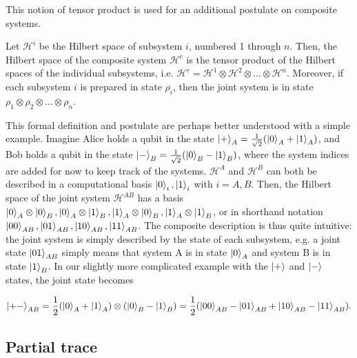 \noindent This notion of tensor product is used for an additional postulate on composite systems.

\begin{postulate} \label{pos:composite}
    Let $\mathcal{H}^i$ be the Hilbert space of subsystem $i$, numbered 1 through $n$. Then, the Hilbert space of the composite system $\mathcal{H}^c$ is the tensor product of the Hilbert spaces of the individual subsystems, i.e. $\mathcal{H}^c = \mathcal{H}^1 \otimes \mathcal{H}^2 \otimes \dots \otimes \mathcal{H}^n$. Moreover, if each subsystem $i$ is prepared in state $\rho_i$, then the joint system is in state $\rho_1 \otimes \rho_2 \otimes \dots \otimes \rho_n$.
\end{postulate}

This formal definition and postulate are perhaps better understood with a simple example. Imagine Alice holds a qubit in the state $\ket{+}_A = \frac{1}{\sqrt{2}}(\ket{0}_A + \ket{1}_A)$, and Bob holds a qubit in the state $\ket{-}_B = \frac{1}{\sqrt{2}}(\ket{0}_B - \ket{1}_B)$, where the system indices are added for now to keep track of the systems. $\mathcal{H}^A$ and $\mathcal{H}^B$ can both be described in a computational basis $\ket{0}_i, \ket{1}_i$ with $i = A, B$. Then, the Hilbert space of the joint system $\mathcal{H}^{AB}$ has a basis $\ket{0}_A \otimes \ket{0}_B, \ket{0}_A \otimes \ket{1}_B, \ket{1}_A \otimes \ket{0}_B, \ket{1}_A \otimes \ket{1}_B$, or in shorthand notation $\ket{00}_{AB}, \ket{01}_{AB}, \ket{10}_{AB}, \ket{11}_{AB}$. The composite description is thus quite intuitive: the joint system is simply described by the state of each subsystem, e.g. a joint state $\ket{01}_{AB}$ simply means that system A is in state $\ket{0}_A$ and system B is in state $\ket{1}_B$. In our slightly more complicated example with the $\ket{+}$ and $\ket{-}$ states, the joint state becomes

\begin{equation}
    \ket{+-}_{AB} = \frac{1}{2}(\ket{0}_A + \ket{1}_A) \otimes (\ket{0}_B - \ket{1}_B) = \frac{1}{2}(\ket{00}_{AB} - \ket{01}_{AB} + \ket{10}_{AB} - \ket{11}_{AB}).
\end{equation}



\subsection{Partial trace} \label{sec:partial_trace}

